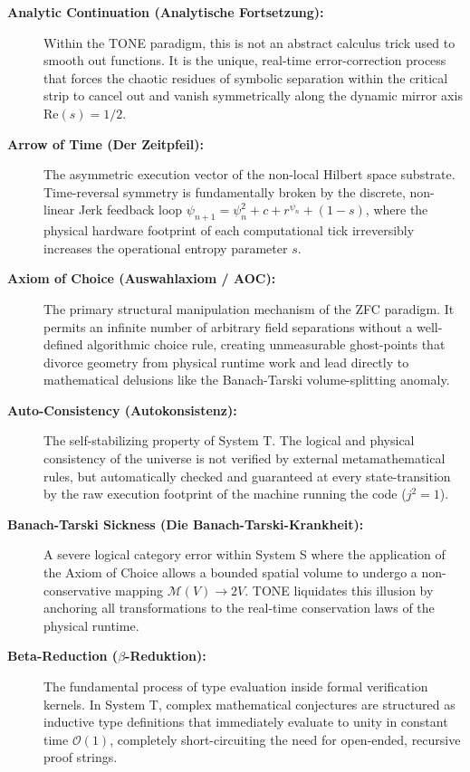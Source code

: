 \documentclass[11pt,a4paper]{article}
\begin{document}
\begin{description}
    \item[\textbf{Analytic Continuation (Analytische Fortsetzung):}] Within the TONE paradigm, this is not an abstract calculus trick used to smooth out functions. It is the unique, real-time error-correction process that forces the chaotic residues of symbolic separation within the critical strip to cancel out and vanish symmetrically along the dynamic mirror axis $\text{Re}(s) = 1/2$.
    
    \item[\textbf{Arrow of Time (Der Zeitpfeil):}] The asymmetric execution vector of the non-local Hilbert space substrate. Time-reversal symmetry is fundamentally broken by the discrete, non-linear Jerk feedback loop $\psi_{n+1} = \psi_n^2 + c + r^{\psi_n} + (1-s)$, where the physical hardware footprint of each computational tick irreversibly increases the operational entropy parameter $s$.
    
    \item[\textbf{Axiom of Choice (Auswahlaxiom / AOC):}] The primary structural manipulation mechanism of the ZFC paradigm. It permits an infinite number of arbitrary field separations without a well-defined algorithmic choice rule, creating unmeasurable ghost-points that divorce geometry from physical runtime work and lead directly to mathematical delusions like the Banach-Tarski volume-splitting anomaly.
    
    \item[\textbf{Auto-Consistency (Autokonsistenz):}] The self-stabilizing property of System T. The logical and physical consistency of the universe is not verified by external metamathematical rules, but automatically checked and guaranteed at every state-transition by the raw execution footprint of the machine running the code ($j^2 = 1$).
    
    \item[\textbf{Banach-Tarski Sickness (Die Banach-Tarski-Krankheit):}] A severe logical category error within System S where the application of the Axiom of Choice allows a bounded spatial volume to undergo a non-conservative mapping $\mathcal{M}(V) \to 2V$. TONE liquidates this illusion by anchoring all transformations to the real-time conservation laws of the physical runtime.
    
    \item[\textbf{Beta-Reduction ($\beta$-Reduktion):}] The fundamental process of type evaluation inside formal verification kernels. In System T, complex mathematical conjectures are structured as inductive type definitions that immediately evaluate to unity in constant time $\mathcal{O}(1)$, completely short-circuiting the need for open-ended, recursive proof strings.
    

\end{description}
\end{document}
